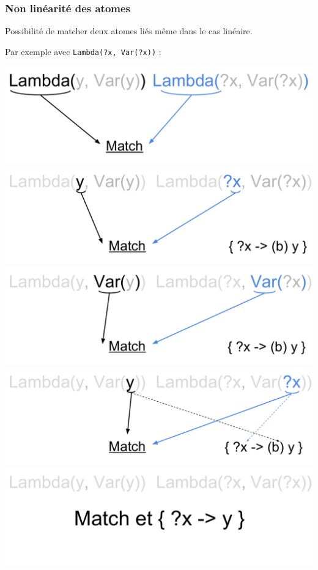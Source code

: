 \begin{frame}
\begin{center}
\end{center}

\end{frame}

\begin{frame}
\frametitle{Non linéarité des atomes}

Possibilité de matcher deux atomes liés même dans le cas linéaire.

Par exemple avec \texttt{Lambda(?x, Var(?x))} :

\bigskip
\begin{center}
      {\includegraphics[scale=0.5]{pattern/atom1.pdf}}
      {\includegraphics[scale=0.5]{pattern/atom2.pdf}}
      {\includegraphics[scale=0.5]{pattern/atom3.pdf}}
      {\includegraphics[scale=0.5]{pattern/atom4.pdf}}
      {\includegraphics[scale=0.5]{pattern/atom5.pdf}}

\end{center}


\end{frame}

